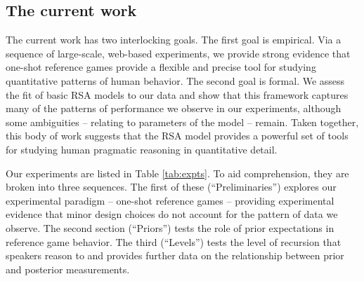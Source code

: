\documentclass[man,noapacite]{apa2}
\begin{document}
\subsection{The current work}

The current work has two interlocking goals. The first goal is empirical. Via a sequence of large-scale, web-based experiments, we provide strong evidence that one-shot reference games provide a flexible and precise tool for studying quantitative patterns of human behavior. The second goal is formal. We assess the fit of basic RSA models to our data and show that this framework captures many of the patterns of performance we observe in our experiments, although some ambiguities -- relating to parameters of the model -- remain. Taken together, this body of work suggests that the RSA model provides a powerful set of tools for studying human pragmatic reasoning in quantitative detail.

Our experiments are listed in Table \ref{tab:expts}. To aid comprehension, they are broken into three sequences. The first of these (``Preliminaries'') explores our experimental paradigm -- one-shot reference games -- providing experimental evidence that minor design choices do not account for the pattern of data we observe. The second section (``Priors'') tests the role of prior expectations in reference game behavior. The third (``Levels'') tests the level of recursion that speakers reason to and provides further data on the relationship between prior and posterior measurements.
\end{document}
